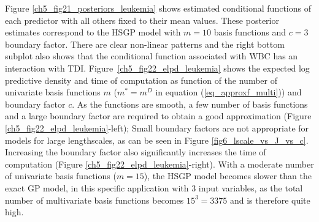 \documentclass[onecolumn,a4paper,11pt]{article}
\begin{document}
Figure \ref{ch5_fig21_posteriors_leukemia} shows estimated conditional functions of each predictor with all others fixed to their mean values. These posterior estimates correspond to the HSGP model with $m=10$ basis functions and $c=3$ boundary factor. There are clear  non-linear patterns and the right bottom subplot also shows that the conditional function associated with WBC has an interaction with TDI.
Figure~\ref{ch5_fig22_elpd_leukemia} shows the expected log predictive density \citep[ELPD; ][]{vehtari_2012,Vehtari+Gelman+Gabry:2017_practical} and time of computation as function of the number of univariate basis functions $m$ ($m^{\ast}=m^D$ in equation (\ref{eq_approxf_multi})) and boundary factor $c$. As the functions are smooth, a few number of basis functions and a large boundary factor are required to obtain a good approximation (Figure \ref{ch5_fig22_elpd_leukemia}-left); Small boundary factors are not appropriate for models for large lengthscales, as can be seen in Figure \ref{fig6_lscale_vs_J_vs_c}. Increasing the boundary factor also significantly increases the time of computation (Figure \ref{ch5_fig22_elpd_leukemia}-right). With a moderate number of univariate basis functions ($m=15$), the HSGP model becomes slower than the exact GP model, in this specific application with $3$ input variables, as the total number of multivariate basis functions becomes $15^3 = 3375$ and is therefore quite high. 
%
\end{document}
